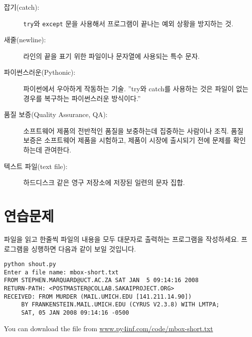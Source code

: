 \begin{description}

\item[잡기(catch):] 
{\tt try}와 {\tt except} 문을 사용해서 프로그램이 끝나는 예외 상황을 방지하는 것.

\item[새줄(newline):] 라인의 끝을 표기 위한 파일이나 문자열에 사용되는 특수 문자.

\item[파이썬스러운(Pythonic):] 파이썬에서 우아하게 작동하는 기술. ''try와 catch를 사용하는 것은 파일이 없는 경우를 복구하는 파이썬스러운 방식이다.''


\item[품질 보증(Quality Assurance, QA):] 
소프트웨어 제품의 전반적인 품질을 보중하는데 집중하는 사람이나 조직.
품질 보증은 소프트웨어 제품을 시험하고, 제품이 시장에 출시되기 전에 문제를 확인하는데 관여한다.

\item[텍스트 파일(text file):] 
하드디스크 같은 영구 저장소에 저장된 일련의 문자 집합.

\end{description}

\section{연습문제}

\begin{ex}
파일을 읽고 한줄씩 파일의 내용을 모두 대문자로 출력하는 프로그램을 작성하세요.
프로그램을 싱행하면 다음과 같이 보일 것입니다.

\beforeverb
\begin{verbatim}
python shout.py
Enter a file name: mbox-short.txt
FROM STEPHEN.MARQUARD@UCT.AC.ZA SAT JAN  5 09:14:16 2008
RETURN-PATH: <POSTMASTER@COLLAB.SAKAIPROJECT.ORG>
RECEIVED: FROM MURDER (MAIL.UMICH.EDU [141.211.14.90])
	 BY FRANKENSTEIN.MAIL.UMICH.EDU (CYRUS V2.3.8) WITH LMTPA;
	 SAT, 05 JAN 2008 09:14:16 -0500
\end{verbatim}
\afterverb
%
You can download the file from
\url{www.py4inf.com/code/mbox-short.txt}
\end{ex}

